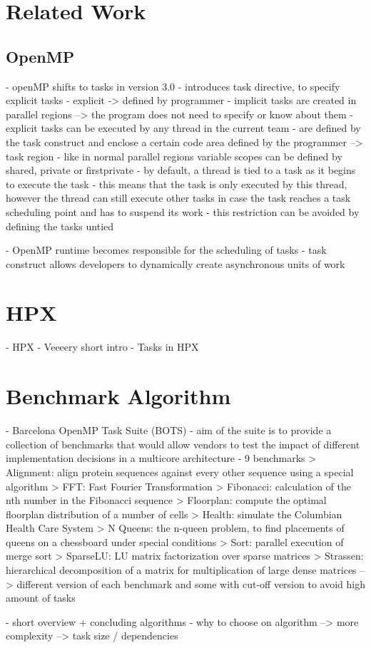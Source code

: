 \section{Related Work}
\subsection{OpenMP}


\cite{Ayguade.2009}
  - openMP shifts to tasks in version 3.0
  - introduces task directive, to specify explicit tasks
  	- explicit -> defined by programmer
    - implicit tasks are created in parallel regions \cite{MKlemm.2018}
    --> the program does not need to specify or know about them
  - explicit tasks can be executed by any thread in the current team
  - are defined by the task construct and enclose a certain code area defined by the programmer --> task region
  - like in normal parallel regions variable scopes can be defined by shared, private or firstprivate
  - by default, a thread is tied to a task as it begins to execute the task
    - this means that the task is only executed by this thread, however the thread can still execute other tasks in case the task reaches a task scheduling point and has to suspend its work
    - this restriction can be avoided by defining the tasks untied
    
\cite{Qawasmeh.2014}
  - OpenMP runtime becomes responsible for the scheduling of tasks
  - task construct allows developers to dynamically create asynchronous units of work


\section{HPX}
- HPX
  - Veeeery short intro
  - Tasks in HPX
    \cite{Kaiser.2009}
    
\section{Benchmark Algorithm}
- Barcelona OpenMP Task Suite (BOTS)
	- aim of the suite is to provide a collection of benchmarks that would allow vendors to test the impact of different implementation decisions in a multicore architecture
	- 9 benchmarks
		> Alignment: align protein sequences against every other sequence using a special algorithm
		> FFT: Fast Fourier Transformation
		> Fibonacci: calculation of the nth number in the Fibonacci sequence
		> Floorplan: compute the optimal floorplan distribution of a number of cells
		> Health: simulate the Columbian Health Care System
		> N Queens: the n-queen problem, to find placements of queens on a chessboard under special conditions
		> Sort: parallel execution of merge sort
		> SparseLU: LU matrix factorization over sparse matrices
		> Strassen: hierarchical decomposition of a matrix for multiplication of large dense matrices
	--> different version of each benchmark and some with cut-off version to avoid high amount of tasks
	
	
  - short overview + concluding algorithms
  - why to choose on algorithm
    --> more complexity
    --> task size / dependencies
    